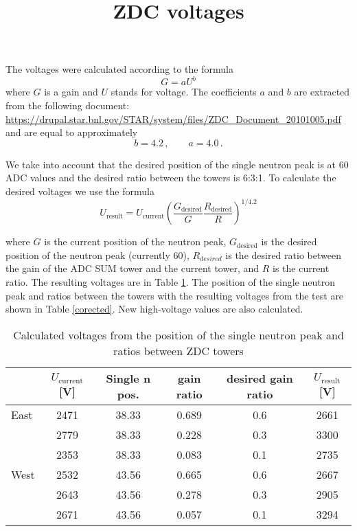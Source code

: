 \documentclass[a4paper,10pt]{article}
\title{ZDC voltages}
\author{}
\date{}
\begin{document}
\maketitle

The voltages were calculated according to the formula
$$
G = aU^b
$$
where $G$ is a gain and $U$ stands for voltage. The coefficients $a$ and $b$ are 
extracted from the following document:\\
\url{https://drupal.star.bnl.gov/STAR/system/files/ZDC_Document_20101005.pdf}\\
and are equal to approximately
\begin{equation}
b=4.2\,, \qquad a=4.0\,.
\end{equation}

We take into account that the desired position of the single neutron peak is at 60 ADC values
and the desired ratio between the towers is 6:3:1. To calculate the desired voltages we use the
formula
\begin{equation}
U_{\text{result}} = U_\text{current}\left(\frac{G_\text{desired}}{G} 
\frac{R_\text{desired}}{R}\right)^{1/4.2}
\end{equation}



where $G$ is the current position of the neutron peak, $G_\text{desired}$ is the desired position
of the neutron peak (currently 60), $R_{desired}$ is the desired ratio between the gain of the ADC SUM
tower and the current tower, and $R$ is the current ratio.
The resulting voltages are in Table \ref{uncorected}. The position of the single neutron peak and
ratios between the towers with the resulting voltages from the test are shown in Table \ref{corected}.
New high-voltage values are also calculated.

\begin{table}[!htb] 
\caption{Calculated voltages from the position of the single neutron peak and ratios 
between ZDC towers}
\label{uncorected}
\begin{center}
\begin{tabular}{lccccc}
 \toprule
 &$U_\text{current}$[V]&Single n pos.&gain ratio&desired gain ratio&$U_\text{result}$[V]\\
\midrule
 East&2471&38.33&0.689&0.6&2661\\
     &2779&38.33&0.228&0.3&3300\\
     &2353&38.33&0.083&0.1&2735\\
 \midrule
West&2532&43.56&0.665&0.6&2667\\
    &2643&43.56&0.278&0.3&2905\\
    &2671&43.56&0.057&0.1&3294\\
 \bottomrule
\end{tabular}
\end{center}
\end{table}
\end{document}
